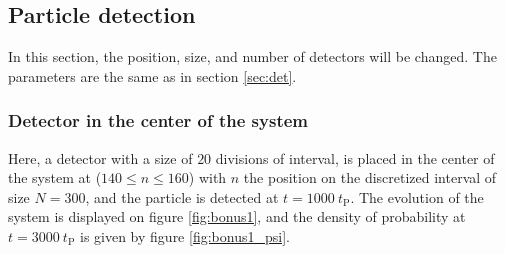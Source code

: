 \documentclass[a4paper,12pt,twoside]{article}
\newcommand{\bracket}[1]{\left(#1\right)}
\newcommand{\abs}[1]{\left|#1\right|}
\begin{document}
    
    \subsection{Particle detection}
    In this section, the position, size, and number of detectors will be changed. The parameters are the same as in section \ref{sec:det}.
    
    \subsubsection{Detector in the center of the system}
    Here, a detector with a size of $20$ divisions of interval, is placed in the center of the system at ($140\leq n \leq160$) with 
    $n$ the position on the discretized interval of size $N=300$, and the particle is detected at $t=1000~t_\text{P}$. The evolution of the system is displayed on figure \ref{fig:bonus1}, and the density of probability at $t=3000~t_\text{P}$ is given by figure \ref{fig:bonus1_psi}.
    
\end{document}
